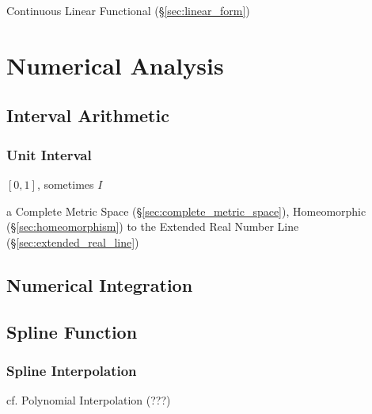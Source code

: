 Continuous Linear Functional (\S\ref{sec:linear_form})



\section{Numerical Analysis}\label{sec:numerical_analysis}

\subsection{Interval Arithmetic}\label{sec:interval_arithmetic}

\subsubsection{Unit Interval}\label{sec:unit_interval}

$[0,1]$, sometimes $I$

a Complete Metric Space (\S\ref{sec:complete_metric_space}),
Homeomorphic (\S\ref{sec:homeomorphism}) to the Extended Real Number
Line (\S\ref{sec:extended_real_line})



\subsection{Numerical Integration}\label{sec:numerical_integration}

\subsection{Spline Function}\label{sec:spline}

\subsubsection{Spline Interpolation}\label{sec:spline_interpolation}

cf. Polynomial Interpolation (???) %



